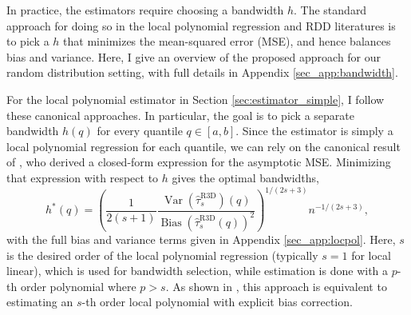 \documentclass[12pt]{article}
\begin{document}
In practice, the estimators require choosing a bandwidth $h$. The standard approach for doing so in the local polynomial regression and RDD literatures is to pick a $h$ that minimizes the mean-squared error (MSE), and hence balances bias and variance. Here, I give an overview of the proposed approach for our random distribution setting, with full details in Appendix \ref{sec_app:bandwidth}. 

For the local polynomial estimator in Section \ref{sec:estimator_simple}, I follow these canonical approaches. In particular, the goal is to pick a separate bandwidth $h(q)$ for every quantile $q \in [a,b]$. Since the estimator is simply a local polynomial regression for each quantile, we can rely on the canonical result of \citet{fan1992variable}, who derived a closed-form expression for the asymptotic MSE. Minimizing that expression with respect to $h$ gives the optimal bandwidths,
\begin{equation} \label{eq:pointwise_bandwidth}
h^*(q)=\left(\frac{1}{2(s+1)} \frac{\operatorname{Var}(\hat{\tau}_s^{\mathrm{R3D}})(q)}{\operatorname{Bias}(\hat{\tau}_s^{\mathrm{R3D}}(q))^2}\right)^{1 /(2 s+3)} n^{-1 /(2 s+3)},
\end{equation}
with the full bias and variance terms given in Appendix \ref{sec_app:locpol}. Here, $s$ is the desired order of the local polynomial regression (typically $s=1$ for local linear), which is used for bandwidth selection, while estimation is done with a $p$-th order polynomial where $p>s$. As shown in \citet{calonico2014robust}, this approach is equivalent to estimating an $s$-th order local polynomial with explicit bias correction. 
\end{document}
